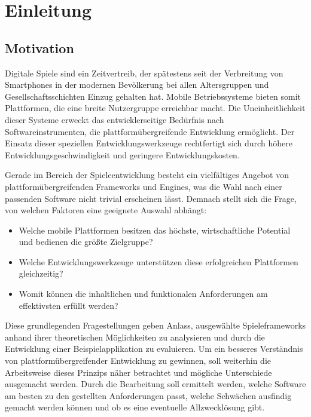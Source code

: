 \tableofcontents
\clearpage




\chapter{Einleitung}

\section{Motivation}
Digitale Spiele sind ein Zeitvertreib, der spätestens seit der Verbreitung von Smartphones in der modernen Bevölkerung bei allen Altersgruppen und Gesellschaftsschichten Einzug gehalten hat. Mobile Betriebssysteme bieten somit Plattformen, die eine breite Nutzergruppe erreichbar macht. Die Uneinheitlichkeit dieser Systeme erweckt das entwicklerseitige Bedürfnis nach Softwareinstrumenten, die plattformübergreifende Entwicklung ermöglicht. Der Einsatz dieser speziellen Entwicklungswerkzeuge rechtfertigt sich durch höhere Entwicklungsgeschwindigkeit und geringere Entwicklungskosten.

\bigskip
Gerade im Bereich der Spieleentwicklung besteht ein vielfältiges Angebot von plattformübergreifenden Frameworks und Engines, was die Wahl nach einer passenden Software nicht trivial erscheinen lässt. Demnach stellt sich die Frage, von welchen Faktoren eine geeignete Auswahl abhängt:

\begin{itemize}
	\item Welche mobile Plattformen besitzen das höchste, wirtschaftliche Potential und bedienen die größte Zielgruppe?
	\item Welche Entwicklungswerkzeuge unterstützen diese erfolgreichen Plattformen gleichzeitig?
	\item Womit können die inhaltlichen und funktionalen Anforderungen am effektivsten erfüllt werden?
\end{itemize}

Diese grundlegenden Fragestellungen geben Anlass, ausgewählte Spieleframeworks anhand ihrer theoretischen Möglichkeiten zu analysieren und durch die Entwicklung einer Beispielapplikation zu evaluieren. Um ein besseres Verständnis von plattformübergreifender Entwicklung zu gewinnen, soll weiterhin die Arbeitsweise dieses Prinzips näher betrachtet und mögliche Unterschiede ausgemacht werden. Durch die Bearbeitung soll ermittelt werden, welche Software am besten zu den gestellten Anforderungen passt, welche Schwächen ausfindig gemacht werden können und ob es eine eventuelle Allzwecklösung gibt.

